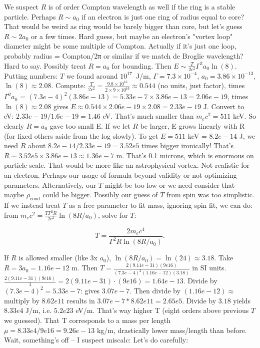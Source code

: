 \documentclass[12pt]{article}
\begin{document}
We suspect $R$ is of order Compton wavelength as well if the ring is a stable particle. Perhaps $R \sim a_0$ if an electron is just one ring of radius equal to core? That would be weird as ring would be barely bigger than core, but let's guess $R \sim 2a_0$ or a few times. Hard guess, but maybe an electron's "vortex loop" diameter might be some multiple of Compton. Actually if it’s just one loop, probably radius = Compton/2π or similar if we match de Broglie wavelength? Hard to say. Possibly treat $R = a_0$ for bounding. Then $E \sim \frac{T}{2c^2} \Gamma^2 a_0 \ln(8)$. Putting numbers: $T$ we found around $10^{17}$ J/m, $\Gamma = 7.3\times10^{-4}$, $a_0=3.86\times10^{-13}$, $\ln(8)\approx2.08$. Compute: $\frac{T}{2c^2} = \frac{9.8\times10^{16}}{2\times9\times10^{16}} \approx 0.544$ (no units, just factor), times $\Gamma^2 a_0$ = $(7.3e-4)^2 (3.86e-13) = 5.33e-7 \times 3.86e-13 = 2.06e-19$, times $\ln(8)\approx 2.08$ gives $E\approx 0.544\times 2.06e-19 \times2.08 = 2.33e-19$ J. Convert to eV: $2.33e-19/1.6e-19 = 1.46$ eV. That’s much smaller than $m_e c^2 = 511$ keV. So clearly $R=a_0$ gave too small E. If we let $R$ be larger, E grows linearly with R (for fixed others aside from the log slowly). To get $E=511$ keV = $8.2e-14$ J, we need $R$ about $8.2e-14 / 2.33e-19 = 3.52e5$ times bigger ironically! That’s $R \sim 3.52e5 \times 3.86e-13 \approx 1.36e-7$ m. That’s 0.1 microns, which is enormous on particle scale. That would be more like an astrophysical vortex. Not realistic for an electron. Perhaps our usage of formula beyond validity or not optimizing parameters. Alternatively, our $T$ might be too low or we need consider that maybe $\rho_{\text{cond}}$ could be bigger. Possibly our guess of $T$ from spin was too simplistic. If we instead treat $T$ as a free parameter to fit mass, ignoring spin fit, we can do: from $m_e c^2 = \frac{T \Gamma^2 R}{2c^2} \ln(8R/a_0)$, solve for $T$: 

\[T = \frac{2 m_e c^4}{\Gamma^2 R \ln(8R/a_0)}.\] 

If $R$ is allowed smaller (like 3x $a_0$), $\ln(8R/a_0)=\ln(24) \approx 3.18$. Take $R=3a_0 = 1.16e-12$ m. Then $T = \frac{2(9.11e-31)(9e16)}{(7.3e-4)^2 (1.16e-12)(3.18)}$ in SI units. $\frac{2(9.11e-31)(9e16)}{1}= 2(9.11e-31)\cdot(9e16) = 1.64e-13$. Divide by $(7.3e-4)^2 = 5.33e-7$: gives $3.07e-7$. Then divide by $(1.16e-12)\approx$ multiply by $8.62e11$ results in $3.07e-7 * 8.62e11 = 2.65e5$. Divide by $3.18$ yields $8.33e4$ J/m, i.e. $5.2e23$ eV/m. That’s way higher T (eight orders above previous $T$ we guessed). That T corresponds to a mass per length $\mu = 8.33e4/9e16 = 9.26e-13$ kg/m, drastically lower mass/length than before. Wait, something’s off – I suspect miscalc: Let's do carefully:
\end{document}
